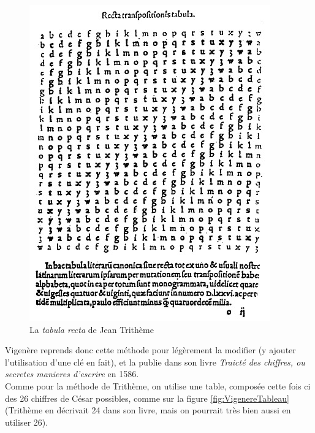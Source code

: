 \begin{figure}[h]
  \begin{center}
    \includegraphics[scale=0.5]{images/TabulaRecta.jpg}
  \end{center}
  \caption{La \emph{tabula recta} de Jean Trithème}
  \label{fig:TabulaRecta}
\end{figure}

Vigenère reprends donc cette méthode pour légèrement la modifier (y
ajouter l'utilisation d'une clé en fait), et la publie dans son livre
\emph{Traicté des chiffres, ou secretes
  manieres d'escrire} en 1586. \\

Comme pour la méthode de Trithème, on utilise une table, composée
cette fois ci des 26 chiffres de César possibles, comme sur la figure
\ref{fig:VigenereTableau} (Trithème en décrivait 24 dans son livre,
mais on pourrait très bien aussi en utiliser 26). \\

